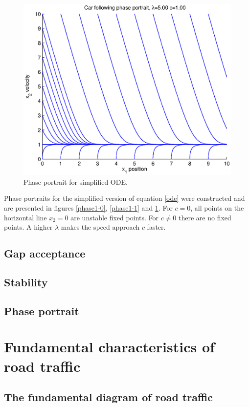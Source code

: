 \documentclass[11pt,a4paper]{article}
\begin{document}
\begin{figure}[ht]
\centering
\includegraphics[width=400pt]{phase5-1}
\caption{Phase portrait for simplified ODE.}
\label{phase5-1}
\end{figure}

Phase portraits for the simplified version of equation \ref{ode} were constructed and are
presented in figures \ref{phase1-0}, \ref{phase1-1} and \ref{phase5-1}. For
$c=0$, all points on the horizontal line $x_2=0$ are unstable fixed points. For
$c \neq 0$ there are no fixed points. A higher $\lambda$ makes the speed
approach $c$ faster.

\subsection{Gap acceptance}
\subsection{Stability}
\subsection{Phase portrait}

\section{Fundamental characteristics of road traffic}
\subsection{The fundamental diagram of road traffic}
\end{document}
